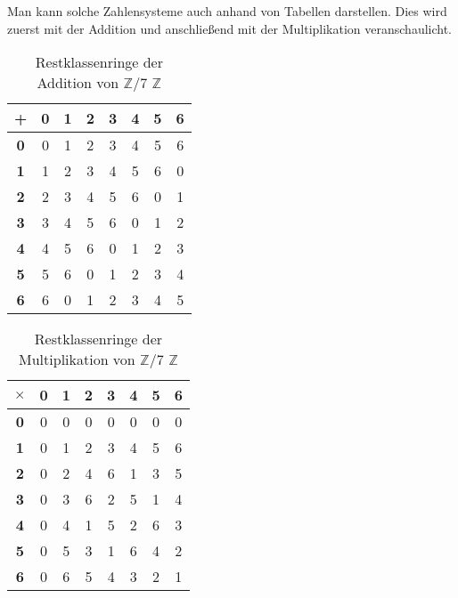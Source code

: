 \documentclass[12pt,a4paper]{article}
\theoremstyle{definition}
\begin{document}
Man kann solche Zahlensysteme auch anhand von Tabellen darstellen.
Dies wird zuerst mit der Addition und anschließend mit der Multiplikation veranschaulicht.
\begin{table}[h]\begin{center}
\begin{tabular}{c||c|c|c|c|c|c|c}
\textbf{+} & \textbf{0} & \textbf{1} & \textbf{2} & \textbf{3} & \textbf{4} & \textbf{5} & \textbf{6} \\
\hline\hline
\textbf{0} & 0 & 1 & 2 & 3 & 4 & 5 & 6 \\
\hline
\textbf{1} & 1 & 2 & 3 & 4 & 5 & 6 & 0 \\
\hline
\textbf{2} & 2 & 3 & 4 & 5 & 6 & 0 & 1 \\
\hline
\textbf{3} & 3 & 4 & 5 & 6 & 0 & 1 & 2 \\
\hline
\textbf{4} & 4 & 5 & 6 & 0 & 1 & 2 & 3 \\
\hline
\textbf{5} & 5 & 6 & 0 & 1 & 2 & 3 & 4 \\
\hline
\textbf{6} & 6 & 0 & 1 & 2 & 3 & 4 & 5
\end{tabular}\end{center}
\caption{Restklassenringe der Addition von $\mathbb{Z}$/7 $\mathbb{Z}$}
\label{tab:Restklassenringe der Addition}
\end{table}

\begin{table}[h]\begin{center}
\begin{tabular}{c||c|c|c|c|c|c|c}
\textbf{$\times$} & \textbf{0} & \textbf{1} & \textbf{2} & \textbf{3} & \textbf{4} & \textbf{5} & \textbf{6} \\
\hline\hline
\textbf{0} & 0 & 0 & 0 & 0 & 0 & 0 & 0 \\
\hline
\textbf{1} & 0 & 1 & 2 & 3 & 4 & 5 & 6 \\
\hline
\textbf{2} & 0 & 2 & 4 & 6 & 1 & 3 & 5 \\
\hline
\textbf{3} & 0 & 3 & 6 & 2 & 5 & 1 & 4 \\
\hline
\textbf{4} & 0 & 4 & 1 & 5 & 2 & 6 & 3 \\
\hline
\textbf{5} & 0 & 5 & 3 & 1 & 6 & 4 & 2 \\
\hline
\textbf{6} & 0 & 6 & 5 & 4 & 3 & 2 & 1
\end{tabular}\end{center}
\caption{Restklassenringe der Multiplikation von $\mathbb{Z}$/7 $\mathbb{Z}$}
\label{tab:Restklassenringe der Multiplikation}
\end{table}
\end{document}
